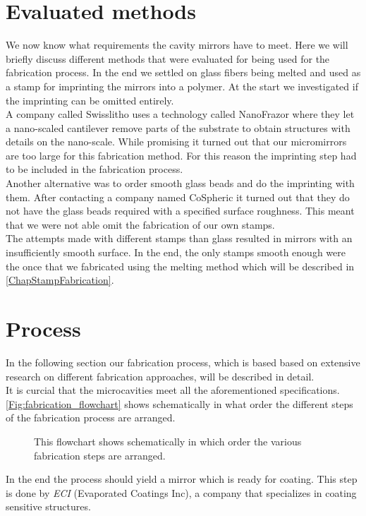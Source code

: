 \section{Evaluated methods}
We now know what requirements the cavity mirrors have to meet. Here we will briefly discuss different methods that were evaluated for being used for the fabrication process. In the end we settled on glass fibers being melted and used as a stamp for imprinting the mirrors into a polymer. At the start we investigated if the imprinting can be omitted entirely.\\
A company called Swisslitho uses a technology called NanoFrazor where they let a nano-scaled cantilever remove parts of the substrate to obtain structures with details on the nano-scale. While promising it turned out that our micromirrors are too large for this fabrication method. For this reason the imprinting step had to be included in the fabrication process.\\
Another alternative was to order smooth glass beads and do the imprinting with them. After contacting a company named CoSpheric it turned out that they do not have the glass beads required with a specified surface roughness. This meant that we were not able omit the fabrication of our own stamps.\\
The attempts made with different stamps than glass resulted in mirrors with an insufficiently smooth surface. In the end, the only stamps smooth enough were the once that we fabricated using the melting method which will be described in \autoref{ChapStampFabrication}.
\newpage


\section{Process}
In the following section our fabrication process, which is based based on extensive research on different fabrication approaches, will be described in detail.\\
It is curcial that the microcavities meet all the aforementioned specifications. \autoref{Fig:fabrication_flowchart} shows schematically in what order the different steps of the fabrication process are arranged.
\begin{figure}[H]
	
	\caption{This flowchart shows schematically in which order the various fabrication steps are arranged.}
	\label{Fig:fabrication_flowchart}
\end{figure}
In the end the process should yield a mirror which is ready for coating. This step is done by \textit{ECI} (Evaporated Coatings Inc), a company that specializes in coating sensitive structures.

